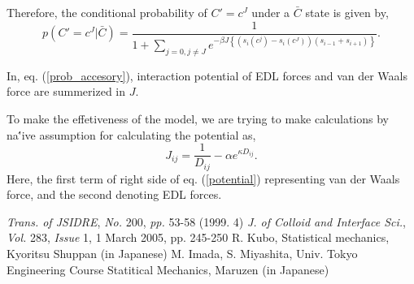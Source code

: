 \documentclass{article}
\begin{document}
Therefore, the conditional probability of $C' = c^J$ under a $\bar{C}$ state is given by,
\begin{equation}
 p (C' = c^J|\bar{C}) = \frac{1}{1+\sum_{j=0, j\not= J}e^{-\beta J \left\{(s_i (c^j) - s_i (c^J))(s_{i-1} + s_{i+1})\right\}}}. 
  \label{prob_accesory}
\end{equation}

In, eq. (\ref{prob_accesory}), interaction potential of EDL forces and van der Waals force are summerized in $J$.

To make the effetiveness of the model, we are trying to make calculations by na\''{i}ve assumption for calculating the potential as,
\begin{equation}
 J_{ij} = \frac{1}{D_{ij}} - \alpha e^{\kappa D_{ij}}.   \label{potential}
\end{equation}
Here, the first term of right side of eq. (\ref{potential}) representing van der Waals force, and the second denoting EDL forces.





\begin{thebibliography}{99}
   \textit{Trans. of JSIDRE}, \textit{No.} 200, \textit{pp.} 53-58 (1999. 4)
  \textit{J. of Colloid and Interface Sci.}, \textit{Vol.} 283, \textit{Issue} 1, 1 March 2005, pp. 245-250
     R. Kubo, Statistical mechanics, Kyoritsu Shuppan (in Japanese)
  M. Imada, S. Miyashita, Univ. Tokyo Engineering Course Statitical Mechanics, Maruzen (in Japanese)
\end{thebibliography}
\end{document}
